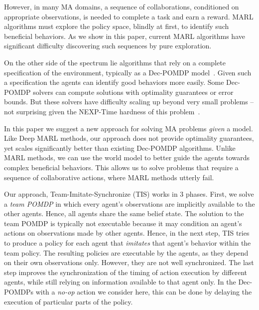 \documentclass[runningheads]{llncs}
\begin{document}
However, in many MA domains, a sequence of collaborations, conditioned on appropriate observations, is needed to complete a task and earn a reward. MARL algorithms must explore the policy space, blindly at first, to identify such beneficial behaviors. 
As we show in this paper, current MARL algorithms have significant difficulty discovering such sequences by pure exploration.
 
On the other side of the spectrum lie algorithms that rely on a complete specification of the environment, typically as a Dec-POMDP model~\cite{DECPOMDPCOMP}. Given such a specification the agents can identify good behaviors more easily. Some Dec-POMDP solvers can compute solutions with optimality guarantees or error bounds.  But these solvers have difficulty scaling up beyond very small problems --
not surprising given the NEXP-Time hardness of this problem~\cite{DECPOMDPCOMP}. 

In this paper we suggest a new approach for solving MA problems {\em given} a model.
Like Deep MARL methods, our approach does not provide  optimality guarantees, yet scales significantly better than existing Dec-POMDP algorithms. Unlike MARL methods, we can use the world model to better guide the agents towards complex beneficial behaviors. This allows us to 
solve problems that require a sequence of collaborative actions, where MARL methods utterly fail.

Our approach, Team-Imitate-Synchronize (TIS) works in 3 phases. First, we solve a {\em team POMDP}
in which every agent's observations are implicitly available to the other agents. Hence, all agents share the same belief state. 
The solution to the team POMDP is typically not
executable because it may condition an agent's actions on observations made 
by other agents. Hence, in the next step, TIS tries to produce a policy for each agent that 
{\em imitates} that agent's behavior within the team policy. 
The resulting policies are executable by the agents, as they depend on their own observations only. However, they are not well synchronized. The last step improves the synchronization of the timing of action execution by different agents, while still relying on information available to that agent only. In the Dec-POMDPs with a {\em no-op} action we consider here, this can be done by delaying the execution of particular parts of the policy.
\end{document}
